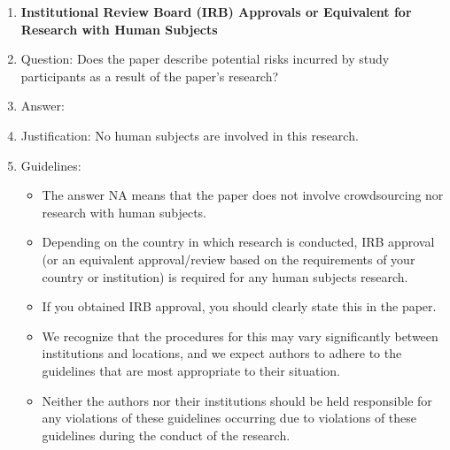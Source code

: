 \documentclass{article}
\begin{document}
\begin{enumerate}
\item {\bf Institutional Review Board (IRB) Approvals or Equivalent for Research with Human Subjects}
\item[] Question: Does the paper describe potential risks incurred by study participants as a result of the paper's research?
\item[] Answer: \answerNA{}
\item[] Justification: No human subjects are involved in this research.
\item[] Guidelines:
\begin{itemize}
    \item The answer NA means that the paper does not involve crowdsourcing nor research with human subjects.
    \item Depending on the country in which research is conducted, IRB approval (or an equivalent approval/review based on the requirements of your country or institution) is required for any human subjects research.
    \item If you obtained IRB approval, you should clearly state this in the paper.
    \item We recognize that the procedures for this may vary significantly between institutions and locations, and we expect authors to adhere to the guidelines that are most appropriate to their situation.
    \item Neither the authors nor their institutions should be held responsible for any violations of these guidelines occurring due to violations of these guidelines during the conduct of the research.
\end{itemize}

\end{enumerate}
\end{document}
